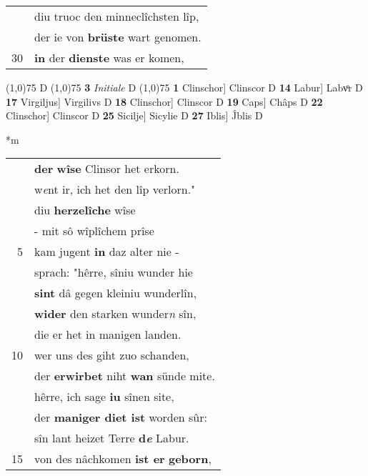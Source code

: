 \documentclass[8pt,a4paper,notitlepage]{article}
\begin{document}
\begin{table}[ht]
\begin{minipage}[t]{0.5\linewidth}
\begin{tabular}{rl}
 & diu truoc den minneclîchsten lîp,\\ 
 & der ie von \textbf{brüste} wart genomen.\\ 
30 & \textbf{in} der \textbf{dienste} was er komen,\\ 
\end{tabular}
\scriptsize
\line(1,0){75} \newline
D \newline
\line(1,0){75} \newline
\textbf{3} \textit{Initiale} D  \newline
\line(1,0){75} \newline
\textbf{1} Clinschor] Clinscor D \textbf{14} Labur] Labvͦr D \textbf{17} Virgiljus] Virgilivs D \textbf{18} Clinschor] Clinscor D \textbf{19} Caps] Châps D \textbf{22} Clinschor] Clinscor D \textbf{25} Sicilje] Sicylie D \textbf{27} Iblis] Ĵblis D \newline
\end{minipage}
\hspace{0.5cm}
\begin{minipage}[t]{0.5\linewidth}
\small
\begin{center}*m
\end{center}
\begin{tabular}{rl}
 & \textbf{der} \textbf{wîse} Clinsor het erkorn.\\ 
 & w\textit{e}nt ir, ich het den lîp verlorn."\\ 
 & diu \textbf{herzelîche} wîse\\ 
 & - mit sô wîplîchem prîse\\ 
5 & kam jugent \textbf{in} daz alter nie -\\ 
 & sprach: "hêrre, sîniu wunder hie\\ 
 & \textbf{sint} dâ gegen kleiniu wunderlîn,\\ 
 & \textbf{wider} den starken wunder\textit{n} sîn,\\ 
 & die er het in manigen landen.\\ 
10 & wer uns des giht zuo schanden,\\ 
 & der \textbf{erwirbet} niht \textbf{wan} sünde mite.\\ 
 & hêrre, ich sage \textbf{iu} sînen site,\\ 
 & der \textbf{maniger diet ist} worden sûr:\\ 
 & sîn lant heizet Terre \textbf{d\textit{e}} Labur.\\ 
15 & von des nâchkomen \textbf{ist er} \textbf{geborn},\\ 

\end{tabular}
\end{minipage}
\end{table}
\end{document}
